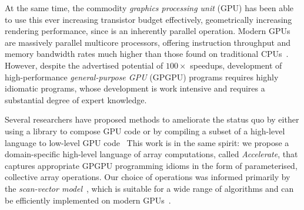 At the same time, the commodity \emph{graphics processing unit} (GPU)\gpu{} has
been able to use this ever increasing transistor budget effectively,
geometrically increasing rendering performance, since  is
an inherently parallel operation.
%
%
Modern GPUs are massively parallel multicore processors, offering instruction
throughput and memory bandwidth rates much higher than those found on
traditional CPUs~\cite{NVIDIA:2012wf}. However, despite the advertised potential
of $100\times$ speedups, development of high-performance \emph{general-purpose
GPU} (GPGPU)\gpgpu{} programs requires highly idiomatic programs, whose
development is work intensive and requires a substantial degree of expert
knowledge.

Several researchers have proposed methods to ameliorate the status quo by either
using a library to compose GPU\gpu{} code or by compiling a subset of a
high-level language to low-level GPU
code~\cite{McCool:2004,Bond:2010bd,ThrustAParallelT:ub,Catanzaro:2011cn,Mainland:2010vj,CLyther:EvXSiruK,Muranushi:2012eh}
This work is in the same spirit: we propose a domain-specific high-level
language of array computations, called \emph{Accelerate}, that captures
appropriate GPGPU\gpgpu{} programming idioms in the form of parameterised,
collective array operations. Our choice of operations was informed primarily by
the \emph{scan-vector model}~\cite{Chatterjee:1990vj}, which is suitable for a
wide range of algorithms and can be efficiently implemented on modern
GPUs~\cite{Sengupta:2007tc}.

